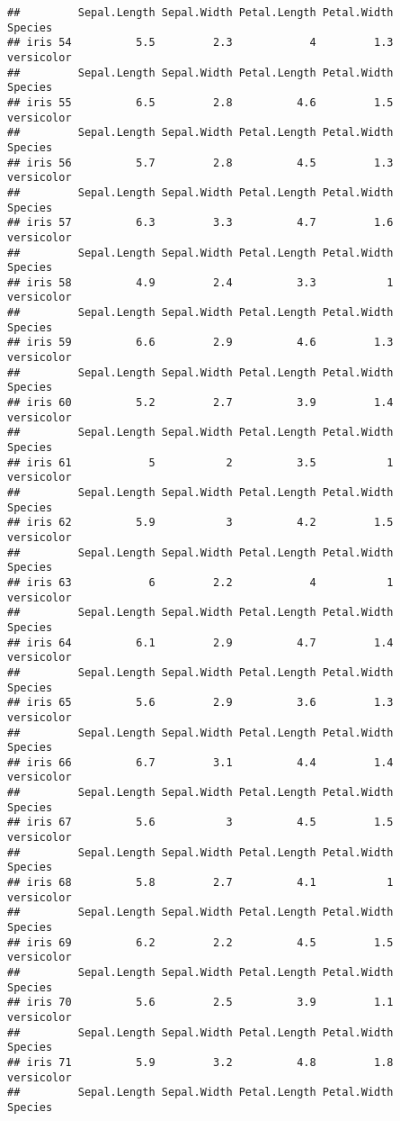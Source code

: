\documentclass[
]{article}
\begin{document}
\begin{verbatim}
##         Sepal.Length Sepal.Width Petal.Length Petal.Width    Species
## iris 54          5.5         2.3            4         1.3 versicolor
##         Sepal.Length Sepal.Width Petal.Length Petal.Width    Species
## iris 55          6.5         2.8          4.6         1.5 versicolor
##         Sepal.Length Sepal.Width Petal.Length Petal.Width    Species
## iris 56          5.7         2.8          4.5         1.3 versicolor
##         Sepal.Length Sepal.Width Petal.Length Petal.Width    Species
## iris 57          6.3         3.3          4.7         1.6 versicolor
##         Sepal.Length Sepal.Width Petal.Length Petal.Width    Species
## iris 58          4.9         2.4          3.3           1 versicolor
##         Sepal.Length Sepal.Width Petal.Length Petal.Width    Species
## iris 59          6.6         2.9          4.6         1.3 versicolor
##         Sepal.Length Sepal.Width Petal.Length Petal.Width    Species
## iris 60          5.2         2.7          3.9         1.4 versicolor
##         Sepal.Length Sepal.Width Petal.Length Petal.Width    Species
## iris 61            5           2          3.5           1 versicolor
##         Sepal.Length Sepal.Width Petal.Length Petal.Width    Species
## iris 62          5.9           3          4.2         1.5 versicolor
##         Sepal.Length Sepal.Width Petal.Length Petal.Width    Species
## iris 63            6         2.2            4           1 versicolor
##         Sepal.Length Sepal.Width Petal.Length Petal.Width    Species
## iris 64          6.1         2.9          4.7         1.4 versicolor
##         Sepal.Length Sepal.Width Petal.Length Petal.Width    Species
## iris 65          5.6         2.9          3.6         1.3 versicolor
##         Sepal.Length Sepal.Width Petal.Length Petal.Width    Species
## iris 66          6.7         3.1          4.4         1.4 versicolor
##         Sepal.Length Sepal.Width Petal.Length Petal.Width    Species
## iris 67          5.6           3          4.5         1.5 versicolor
##         Sepal.Length Sepal.Width Petal.Length Petal.Width    Species
## iris 68          5.8         2.7          4.1           1 versicolor
##         Sepal.Length Sepal.Width Petal.Length Petal.Width    Species
## iris 69          6.2         2.2          4.5         1.5 versicolor
##         Sepal.Length Sepal.Width Petal.Length Petal.Width    Species
## iris 70          5.6         2.5          3.9         1.1 versicolor
##         Sepal.Length Sepal.Width Petal.Length Petal.Width    Species
## iris 71          5.9         3.2          4.8         1.8 versicolor
##         Sepal.Length Sepal.Width Petal.Length Petal.Width    Species

\end{verbatim}
\end{document}
